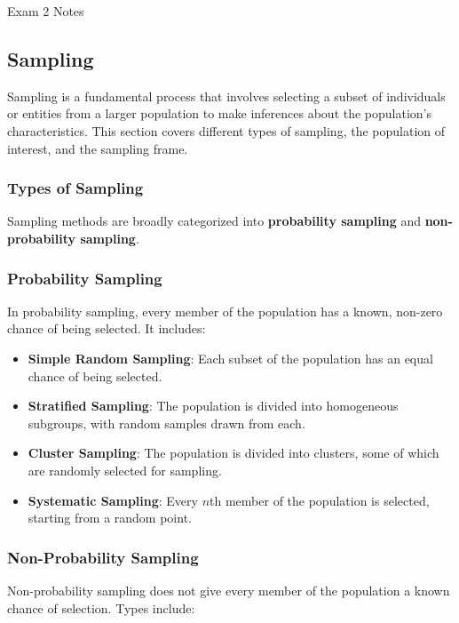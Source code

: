 \begin{examnotes}{Exam 2 Notes}
    \subsection*{Sampling}

    Sampling is a fundamental process that involves selecting a subset of individuals or entities from a larger population to make inferences about the population's characteristics. This section covers 
    different types of sampling, the population of interest, and the sampling frame.
    
    \subsubsection*{Types of Sampling}
    
    Sampling methods are broadly categorized into \textbf{probability sampling} and \textbf{non-probability sampling}.
    
    \subsubsection*{Probability Sampling}
    
    In probability sampling, every member of the population has a known, non-zero chance of being selected. It includes:
    
    \begin{itemize}
        \item \textbf{Simple Random Sampling}: Each subset of the population has an equal chance of being selected.
        \item \textbf{Stratified Sampling}: The population is divided into homogeneous subgroups, with random samples drawn from each.
        \item \textbf{Cluster Sampling}: The population is divided into clusters, some of which are randomly selected for sampling.
        \item \textbf{Systematic Sampling}: Every $n$th member of the population is selected, starting from a random point.
    \end{itemize}
    
    \subsubsection*{Non-Probability Sampling}
    
    Non-probability sampling does not give every member of the population a known chance of selection. Types include:
    

\end{examnotes}
